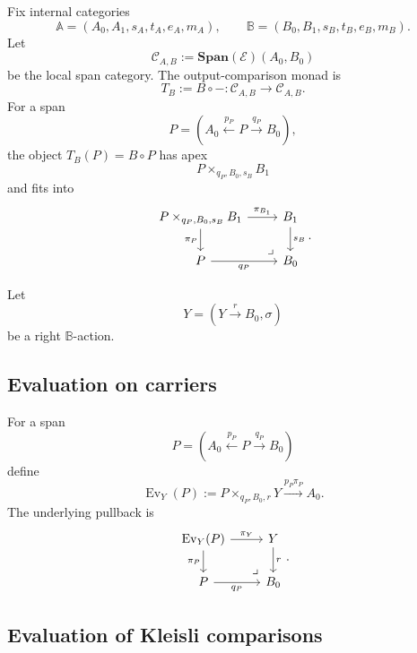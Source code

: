 Fix internal categories
\[
\mathbb A=(A_0,A_1,s_A,t_A,e_A,m_A),
\qquad
\mathbb B=(B_0,B_1,s_B,t_B,e_B,m_B).
\]
Let
\[
\mathcal C_{A,B}:=\mathbf{Span}(\mathcal E)(A_0,B_0)
\]
be the local span category. The output-comparison monad is
\[
T_B:=B\circ -:\mathcal C_{A,B}\to\mathcal C_{A,B}.
\]
For a span
\[
P=\left(A_0\xleftarrow{p_P}P\xrightarrow{q_P}B_0\right),
\]
the object \(T_B(P)=B\circ P\) has apex
\[
P\times_{q_P,B_0,s_B}B_1
\]
and fits into
\[
\begin{tikzcd}
P\times_{q_P,B_0,s_B}B_1
\arrow[r,"\pi_{B_1}"]
\arrow[d,"\pi_P"']
&
B_1
\arrow[d,"s_B"]
\\
P
\arrow[r,"q_P"']
&
B_0
\arrow[ul,phantom,very near start,"\lrcorner"]
\end{tikzcd}
.
\]

Let
\[
Y=(Y\xrightarrow{r}B_0,\sigma)
\]
be a right \(\mathbb B\)-action.

\subsection{Evaluation on carriers}
\label{subsec:relative-evaluation-carriers}

\begin{definition}
\label{def:relative-downstream-evaluation-carriers}
For a span
\[
P=
\left(
A_0\xleftarrow{p_P}P\xrightarrow{q_P}B_0
\right)
\]
define
\[
\operatorname{Ev}_Y(P)
:=
P\times_{q_P,B_0,r}Y
\xrightarrow{p_P\pi_P}
A_0.
\]
The underlying pullback is
\[
\begin{tikzcd}
\operatorname{Ev}_Y(P)
\arrow[r,"\pi_Y"]
\arrow[d,"\pi_P"']
&
Y
\arrow[d,"r"]
\\
P
\arrow[r,"q_P"']
&
B_0
\arrow[ul,phantom,very near start,"\lrcorner"]
\end{tikzcd}
.
\]
\end{definition}

\subsection{Evaluation of Kleisli comparisons}
\label{subsec:relative-evaluation-kleisli-comparisons}

